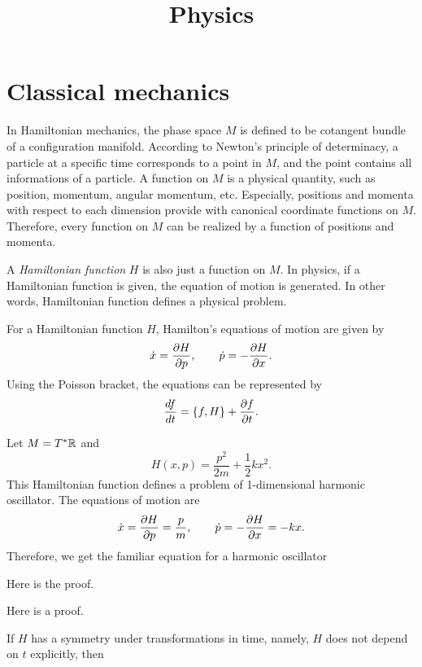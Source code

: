 \documentclass{../prb}
\title{Physics}
\begin{document}
\maketitle
\tableofcontents


\chapter{Classical mechanics}



In Hamiltonian mechanics, the phase space $M$ is defined to be cotangent bundle of a configuration manifold.
According to Newton's principle of determinacy, a particle at a specific time corresponds to a point in $M$, and the point contains all informations of a particle.
A function on $M$ is a physical quantity, such as position, momentum, angular momentum, etc.
Especially, positions and momenta with respect to each dimension provide with canonical coordinate functions on $M$.
Therefore, every function on $M$ can be realized by a function of positions and momenta.

A \emph{Hamiltonian function} $H$ is also just a function on $M$.
In physics, if a Hamiltonian function is given, the equation of motion is generated.
In other words, Hamiltonian function defines a physical problem.

\begin{defn}
For a Hamiltonian function $H$, Hamilton's equations of motion are given by
\[\dot x=\pd{H}{p},\qquad\dot p=-\pd{H}{x}.\]
Using the Poisson bracket, the equations can be represented by
\[\dd{f}{t} = \{f,H\} + \pd{f}{t}.\]
\end{defn}

\begin{prb}
Let $M=T^*\mathbb{R}$ and
\[H(x,p)=\frac{p^2}{2m}+\frac12kx^2.\]
This Hamiltonian function defines a problem of 1-dimensional harmonic oscillator.
The equations of motion are
\[\dot x=\pd{H}{p}=\frac pm,\qquad\dot p=-\pd{H}{x}=-kx.\]
Therefore, we get the familiar equation for a harmonic oscillator
\end{prb}
\begin{sol}
\item Here is the proof.
\item Here is a proof.
\end{sol}


If $H$ has a symmetry under transformations in time, namely, $H$ does not depend on $t$ explicitly, then 
\end{document}

